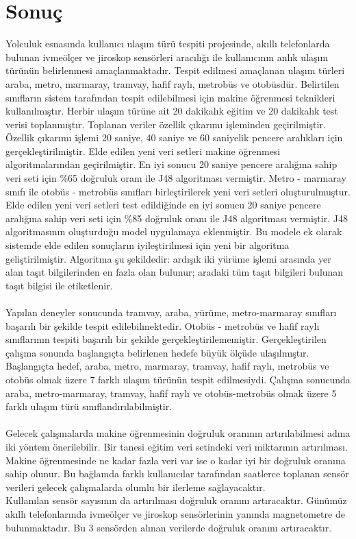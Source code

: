 \chapter{Sonuç}

Yolculuk esnasında kullanıcı ulaşım türü tespiti projesinde, akıllı telefonlarda bulunan ivmeölçer ve jiroskop sensörleri aracılığı ile kullanıcının anlık ulaşım türünün belirlenmesi amaçlanmaktadır. Tespit edilmesi amaçlanan ulaşım türleri araba, metro, marmaray, tramvay, hafif raylı, metrobüs ve otobüsdür. Belirtilen sınıfların sistem tarafından tespit edilebilmesi için makine öğrenmesi teknikleri kullanılmıştır. Herbir ulaşım türüne ait 20 dakikalık eğitim ve 20 dakikalık test verisi toplanmıştır. Toplanan veriler özellik çıkarımı işleminden geçirilmiştir. Özellik çıkarımı işlemi 20 saniye, 40 saniye ve 60 saniyelik pencere aralıkları için gerçekleştirilmiştir. Elde edilen yeni veri setleri makine öğrenmesi algoritmalarından geçirilmiştir. En iyi sonucu 20 saniye pencere aralığına sahip veri seti için \%65 doğruluk oranı ile J48 algoritması vermiştir. Metro - marmaray sınıfı ile otobüs - metrobüs sınıfları birleştirilerek yeni veri setleri oluşturulmuştur. Elde edilen yeni veri setleri test edildiğinde en iyi sonucu 20 saniye pencere aralığına sahip veri seti için \%85 doğruluk oranı ile J48 algoritması vermiştir. J48 algoritmasının oluşturduğu model uygulamaya eklenmiştir. Bu modele ek olarak sistemde elde edilen sonuçların iyileştirilmesi için yeni bir algoritma geliştirilmiştir. Algoritma şu şekildedir: ardışık iki yürüme işlemi arasında yer alan  taşıt bilgilerinden en fazla olan bulunur; aradaki tüm taşıt bilgileri bulunan taşıt bilgisi ile etiketlenir. 
\\
\\
Yapılan deneyler sonucunda tramvay, araba, yürüme, metro-marmaray sınıfları başarılı bir şekilde tespit edilebilmektedir. Otobüs - metrobüs ve hafif raylı sınıflarının tespiti başarılı bir şekilde gerçekleştirilememiştir. Gerçekleştirilen çalışma sonunda başlangıçta belirlenen hedefe büyük ölçüde ulaşılmıştır. Başlangıçta hedef, araba, metro, marmaray, tramvay, hafif raylı, metrobüs ve otobüs olmak üzere 7 farklı ulaşım türünün tespit edilmesiydi. Çalışma sonucunda araba, metro-marmaray, tramvay, hafif raylı ve otobüs-metrobüs olmak üzere 5 farklı ulaşım türü sınıflandırılabilmiştir.
\\
\\
Gelecek çalışmalarda makine öğrenmesinin doğruluk oranının artırılabilmesi adına iki yöntem önerilebilir. Bir tanesi eğitim veri setindeki veri miktarının artırılması. Makine öğrenmesinde ne kadar fazla veri var ise o kadar iyi bir doğruluk oranına sahip olunur. Bu bağlamda farklı kullanıcılar tarafından saatlerce toplanan sensör verileri gelecek çalışmalarda olumlu bir ilerleme sağlayacaktır. 
\\
Kullanılan sensör sayısının da artırılması doğruluk oranını artıracaktır. Günümüz akıllı telefonlarında ivmeölçer ve jiroskop sensörlerinin yanında magnetometre de bulunmaktadır. Bu 3 sensörden alınan verilerde doğruluk oranını artıracaktır.





